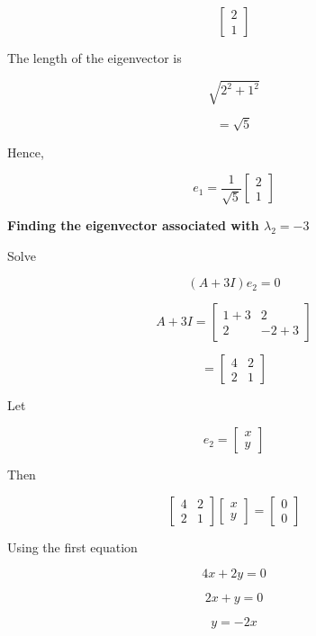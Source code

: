 \documentclass[12pt]{article}
\begin{document}
\[
\begin{bmatrix}
2\\
1
\end{bmatrix}
\]

\noindent
The length of the eigenvector is

\[
\sqrt{2^2+1^2}
\]

\[
=\sqrt{5}
\]

\noindent
Hence,

\[
\boxed{
e_1=
\frac{1}{\sqrt{5}}
\begin{bmatrix}
2\\
1
\end{bmatrix}
}
\]

\vspace{0.7cm}

\noindent
\textbf{Finding the eigenvector associated with \(\lambda_2=-3\)}

\vspace{0.3cm}

\noindent
Solve

\[
(A+3I)e_2=0
\]

\[
A+3I
=
\begin{bmatrix}
1+3 & 2\\
2 & -2+3
\end{bmatrix}
\]

\[
=
\begin{bmatrix}
4 & 2\\
2 & 1
\end{bmatrix}
\]

\noindent
Let

\[
e_2=
\begin{bmatrix}
x\\
y
\end{bmatrix}
\]

\noindent
Then

\[
\begin{bmatrix}
4 & 2\\
2 & 1
\end{bmatrix}
\begin{bmatrix}
x\\
y
\end{bmatrix}
=
\begin{bmatrix}
0\\
0
\end{bmatrix}
\]

\noindent
Using the first equation

\[
4x+2y=0
\]

\[
2x+y=0
\]

\[
y=-2x
\]
\end{document}
